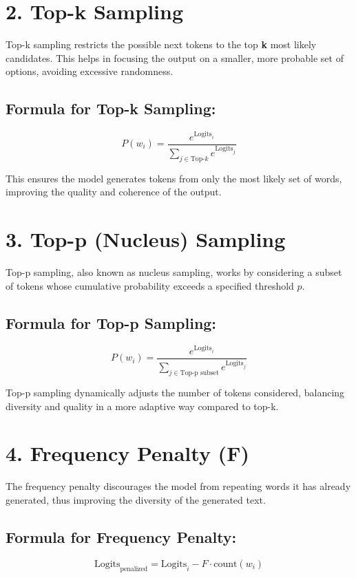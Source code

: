 \documentclass{article}
\begin{document}
\section{2. Top-k Sampling}

Top-k sampling restricts the possible next tokens to the top \textbf{k} most likely candidates. This helps in focusing the output on a smaller, more probable set of options, avoiding excessive randomness.

\subsection*{Formula for Top-k Sampling:}
\[
P(w_i) = \frac{e^{\text{Logits}_i}}{\sum_{j \in \text{Top-}k} e^{\text{Logits}_j}}
\]

This ensures the model generates tokens from only the most likely set of words, improving the quality and coherence of the output.

\section{3. Top-p (Nucleus) Sampling}

Top-p sampling, also known as nucleus sampling, works by considering a subset of tokens whose cumulative probability exceeds a specified threshold \(p\).

\subsection*{Formula for Top-p Sampling:}
\[
P(w_i) = \frac{e^{\text{Logits}_i}}{\sum_{j \in \text{Top-p subset}} e^{\text{Logits}_j}}
\]

Top-p sampling dynamically adjusts the number of tokens considered, balancing diversity and quality in a more adaptive way compared to top-k.

\section{4. Frequency Penalty (F)}

The frequency penalty discourages the model from repeating words it has already generated, thus improving the diversity of the generated text.

\subsection*{Formula for Frequency Penalty:}
\[
\text{Logits}_{\text{penalized}} = \text{Logits}_i - F \cdot \text{count}(w_i)
\]
\end{document}
